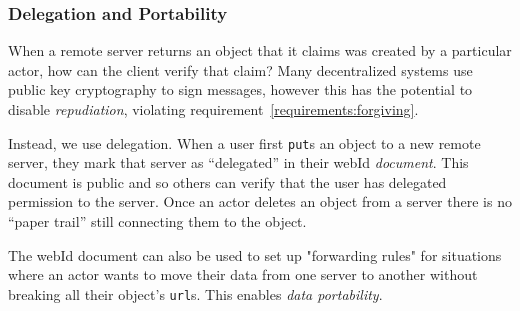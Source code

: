\subsubsection{Delegation and Portability}
\label{above-and-below:delegation}

When a remote server returns an object that it claims
was created by a particular actor, how can the client verify that claim?
Many decentralized systems use public key cryptography to sign messages,
however this has the potential to disable \emph{repudiation},
violating requirement~\ref{requirements:forgiving}.

Instead, we use delegation. When a user first \texttt{put}s an object
to a new remote server, they mark that server as ``delegated'' in their
webId \emph{document}. This document is public and so others can verify
that the user has delegated permission to the server.
Once an actor deletes an object from a server there is no
``paper trail'' still connecting them to the object.

The webId document can also be used to set up "forwarding rules" for
situations where an actor wants to move their data from one server to
another without breaking all their object's \texttt{url}s.
This enables \emph{data portability}.







